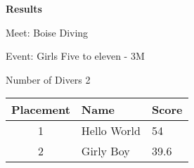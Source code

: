 \documentclass[12pt, letterpaper, landscape]{article}
\begin{document}
	\begin{center}
		\textbf{Results}
	\end{center}
	
    Meet: Boise Diving
    
    Event: Girls Five to eleven - 3M

	Number of Divers 2
	
	\begin{table}[h]
		\centering
			\begin{tabularx}{\textwidth}{|c X X|}
			Placement&Name&Score\\\midrule
            1&Hello World&54\\\midrule
2&Girly Boy&39.6\\\midrule

		\end{tabularx}
	\end{table}
\end{document}
